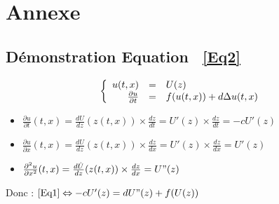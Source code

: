 \documentclass[a4paper,11pt]{article}
\begin{document}
\section{Annexe}
\subsection{Démonstration Equation ~\eqref{Eq2}}

\[
\left\{
\begin{array}{r c l}
u(t,x)&=&U(z)\\
\frac{\partial u}{\partial t}&=&f(u(t,x))+d\Delta u(t,x)
\end{array}
\right.
\]

{\setlength{\baselineskip}{1.8\baselineskip}
\large{
\begin{itemize}[label=$\bullet$]
	\item $\frac{\partial u}{\partial t}(t,x)=\frac{dU}{dz}(z(t,x))\times\frac{dz}{dt}=U'(z)\times \frac{dz}{dt}=-c U'(z)$
    \item $\frac{\partial u}{\partial x}(t,x)=\frac{dU}{dz}(z(t,x))\times\frac{dz}{dx}=U'(z)\times \frac{dz}{dx}=U'(z)$
  	\item $\frac{\partial^2 u}{\partial x^2}(t,x)=\frac{d\dot U}{dz}(z(t,x))\times\frac{dz}{dx}=U"(z)$
\end{itemize}
}
\par}
Donc : $\eqref{Eq1}\Leftrightarrow -c U'(z)=d U"(z)+f(U(z))$
\end{document}
